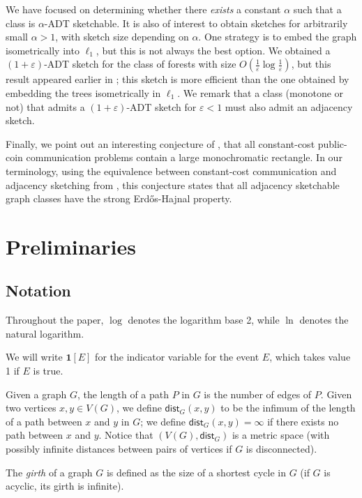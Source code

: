 \documentclass[11pt]{article}
\theoremstyle{definition}
\newcommand{\eps}{\varepsilon}
\newcommand{\dist}{\mathsf{dist}}
\newcommand{\ind}[1]{\mathbf{1}[ #1 ]}
\begin{document}
We have focused on determining whether there \emph{exists} a constant $\alpha$ such that a class is
$\alpha$-ADT sketchable. It is also of interest to obtain sketches for arbitrarily small $\alpha >
1$, with sketch size depending on $\alpha$. One strategy is to embed the graph isometrically into
$\ell_1$, but this is not always the best option. We obtained a $(1+\eps)$-ADT sketch for the
class of forests with size $O\left(\tfrac{1}{\eps}\log\tfrac{1}{\eps}\right)$, but this
result appeared earlier in \cite{AK08}; this sketch is more efficient than the one obtained by
embedding the trees isometrically in $\ell_1$. We remark that a class (monotone or not) that admits
a $(1+\eps)$-ADT sketch for $\eps < 1$ must also admit an adjacency sketch.

Finally, we point out an interesting conjecture of \cite{HHH21b}, that all constant-cost public-coin
communication problems contain a large monochromatic rectangle. In our terminology, using the
equivalence between constant-cost communication and adjacency sketching from \cite{HWZ21}, this
conjecture states that all adjacency sketchable graph classes have the strong Erd{\H o}s-Hajnal
property.

\section{Preliminaries}

\subsection{Notation}

Throughout the paper, $\log$ denotes the logarithm base 2, while $\ln$
denotes the natural logarithm.

\noindent
We will write $\ind{E}$ for the indicator variable for the event $E$, which takes value 1 if $E$ is
true.

\noindent
Given a graph $G$, the length of a path $P$ in $G$ is the number of edges of $P$.  Given two
vertices $x,y \in V(G)$, we define $\dist_{G}(x,y)$ to be the infimum of the length of a path
between $x$ and $y$ in $G$; we define $\dist_{G}(x,y)=\infty$ if there exists no path between $x$ and
$y$.  Notice that $(V(G),\dist_{G})$ is a metric space (with possibly infinite distances between pairs
of vertices if $G$ is disconnected).

\noindent
The \emph{girth} of a graph $G$ is defined as the size of a shortest
cycle in $G$ (if $G$ is acyclic, its girth is infinite).
\end{document}
